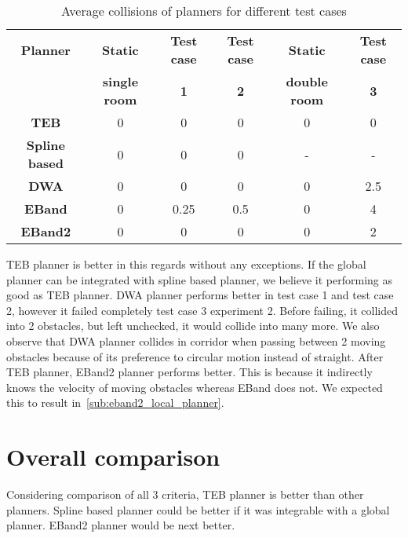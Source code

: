\begin{table}[H]
    \centering
    \begin{tabular}{cccccc}\toprule
        \textbf{Planner} & \textbf{Static} & \textbf{Test case} & \textbf{Test case} & \textbf{Static} & \textbf{Test case} \\
                         & \textbf{single room} & \textbf{1} & \textbf{2} & \textbf{double room}       & \textbf{3} \\\toprule
        \textbf{TEB         } & 0 & 0 & 0 & 0 & 0 \\
        \textbf{Spline based} & 0 & 0 & 0 & \-- & \-- \\
        \textbf{DWA         } & 0 & 0 & 0 & 0 & 2.5 \\
        \textbf{EBand       } & 0 & 0.25 & 0.5 & 0 & 4 \\
        \textbf{EBand2      } & 0 & 0 & 0 & 0 & 2 \\
        \bottomrule
    \end{tabular}
    \caption{Average collisions of planners for different test cases}\label{tab:avg_collisions_planner_comp}
\end{table}

TEB planner is better in this regards without any exceptions. If the global planner can be integrated
with spline based planner, we believe it performing as good as TEB planner. DWA planner performs better in test 
case 1 and test case 2, however it failed completely test case 3 experiment 2. Before failing, it 
collided into 2 obstacles, but left unchecked, it would collide into many more. We also observe that 
DWA planner collides in corridor when passing between 2 moving obstacles because of its preference to 
circular motion instead of straight. After TEB planner, 
EBand2 planner performs better. This is because it indirectly knows the velocity of moving obstacles
whereas EBand does not. We expected this to result in~\ref{sub:eband2_local_planner}.

\section{Overall comparison}%
\label{sec:overall_comparison}

Considering comparison of all 3 criteria, TEB planner is better than other planners. Spline based 
planner could be better if it was integrable with a global planner. EBand2 planner would be next better.
